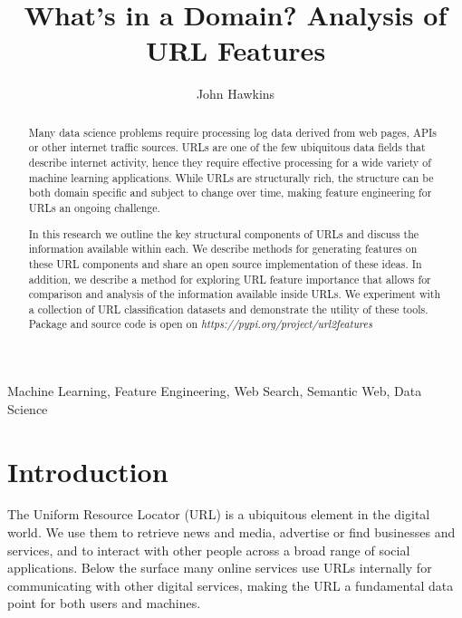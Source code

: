 \documentclass{aircc}
\begin{document}
\title{What's in a Domain? Analysis of URL Features}

\author{John Hawkins}

\maketitle

\begin{abstract}
Many data science problems require processing log data derived from web pages, APIs or other
internet traffic sources. URLs are one of the few ubiquitous data fields that describe
internet activity, hence they require effective processing for a wide variety of machine 
learning applications. While URLs are structurally rich, the structure can be both domain specific
and subject to change over time, making feature engineering for URLs an ongoing challenge.

In this research we outline the key structural components of URLs and discuss the information
available within each. We describe methods for generating features on these URL components and 
share an open source implementation of these ideas. In addition, we describe a method for 
exploring URL feature importance that allows for comparison and analysis of the information 
available inside URLs.
We experiment with a collection of URL classification datasets and demonstrate the utility 
of these tools. Package and source code is open on \textit{https://pypi.org/project/url2features}
\end{abstract}

\begin{keywords}
Machine Learning, Feature Engineering, Web Search, Semantic Web, Data Science
\end{keywords}

\section{Introduction}

The Uniform Resource Locator (URL) is a ubiquitous element in the digital world. 
We use them to retrieve news and media, advertise or find businesses and services, 
and to interact with other people across a broad range of social applications. Below the
surface many online services use URLs internally for communicating with other digital
services, making the URL a fundamental data point for both users and machines.
\end{document}
